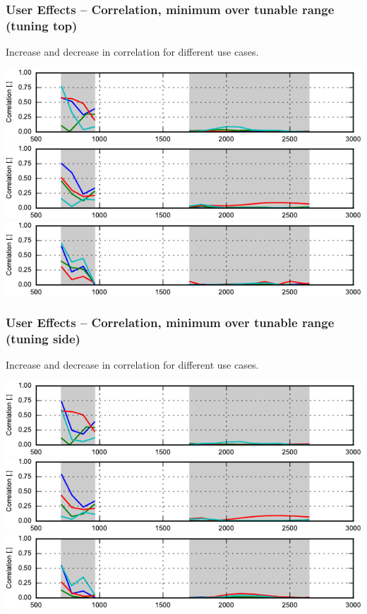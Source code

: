 \begin{frame}
    \frametitle{User Effects -- Correlation, minimum over tunable range (tuning top)}
    Increase and decrease in correlation for different use cases.
    \emptyline
    \begin{center}
        \includegraphics{img/soren/ue/design1lt/corrtop.pdf}\\
        \includegraphics{img/soren/ue/design2sn/corrtop.pdf}\\
        \includegraphics{img/soren/ue/design3hv/corrtop.pdf}
    \end{center}
    \legendfooter
\end{frame}

\begin{frame}
    \frametitle{User Effects -- Correlation, minimum over tunable range (tuning side)}
    Increase and decrease in correlation for different use cases.
    \emptyline
    \begin{center}
        \includegraphics{img/soren/ue/design1lt/corrside.pdf}\\
        \includegraphics{img/soren/ue/design2sn/corrside.pdf}\\
        \includegraphics{img/soren/ue/design3hv/corrside.pdf}
    \end{center}
    \legendfooter
\end{frame}

